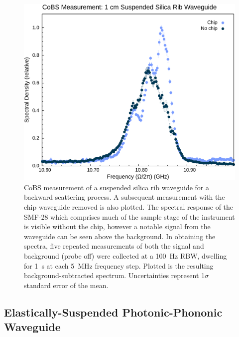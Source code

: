 \begin{figure}[t]
  \centering
  \hspace{-2em}\includegraphics[width=.85\textwidth]{figs/4-Raman/CoBS Measurement: 1 cm Suspended Silica Rib Waveguide.png}
  \caption[\ac{CoBS} measurement of a suspended silica rib waveguide for a backward scattering process.]{\ac{CoBS} measurement of a suspended silica rib waveguide for a backward scattering process. A subsequent measurement with the chip waveguide removed is also plotted. The spectral response of the \ac{SMF-28} which comprises much of the sample stage of the instrument is visible without the chip, however a notable signal from the waveguide can be seen above the background. In obtaining the spectra, five repeated measurements of both the signal and background (probe off) were collected at a \SI{100}{\hertz} \ac{RBW}, dwelling for \SI{1}{\second} at each \SI{5}{\mega\hertz} frequency step. Plotted is the resulting background-subtracted spectrum. Uncertainties represent 1\(\sigma\) standard error of the mean.}
  \label{fig:Raman:August2024chipnochip}
\end{figure}

\subsection{Elastically-Suspended Photonic-Phononic Waveguide}
\label{subsec:Raman:Target:WigglyWaveguide}

